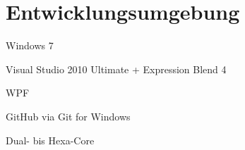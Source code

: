 \section{Entwicklungsumgebung}

\begin{description}[style=multiline,leftmargin=4.5cm]
	\item[Betriebssystem] Windows 7
	\item[Entwicklungsumgebung] Visual Studio 2010 Ultimate + Expression Blend 4
	\item[UI-Bibliothek] WPF
	\item[Versionierung] GitHub via Git for Windows
	\item[Verfügbare Hardware] Dual- bis Hexa-Core
\end{description}
